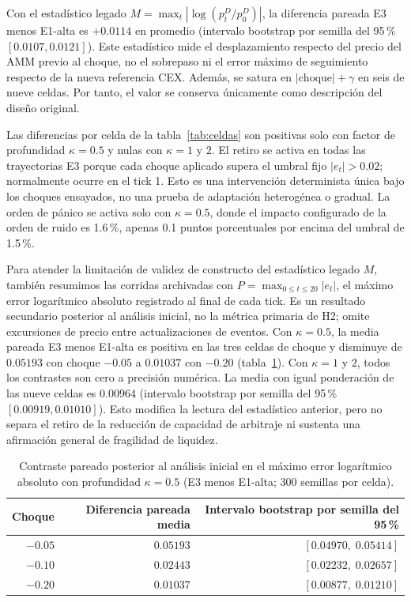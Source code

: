 Con el estadístico legado $M=\max_t|\log(p_t^D/p_0^D)|$, la diferencia pareada E3 menos E1-alta es $+0.0114$ en promedio (intervalo bootstrap por semilla del 95\,\% $[0.0107,0.0121]$). Este estadístico mide el desplazamiento respecto del precio del AMM previo al choque, no el sobrepaso ni el error máximo de seguimiento respecto de la nueva referencia CEX. Además, se satura en $|\text{choque}|+\gamma$ en seis de nueve celdas. Por tanto, el valor se conserva únicamente como descripción del diseño original.

Las diferencias por celda de la tabla~\ref{tab:celdas} son positivas solo con factor de profundidad $\kappa=0.5$ y nulas con $\kappa=1$ y $2$. El retiro se activa en todas las trayectorias E3 porque cada choque aplicado supera el umbral fijo $|e_t|>0.02$; normalmente ocurre en el tick 1. Esto es una intervención determinista única bajo los choques ensayados, no una prueba de adaptación heterogénea o gradual. La orden de pánico se activa solo con $\kappa=0.5$, donde el impacto configurado de la orden de ruido es 1.6\,\%, apenas 0.1 puntos porcentuales por encima del umbral de 1.5\,\%.

Para atender la limitación de validez de constructo del estadístico legado $M$, también resumimos las corridas archivadas con $P=\max_{0\le t\le20}|e_t|$, el máximo error logarítmico absoluto registrado al final de cada tick. Es un resultado secundario posterior al análisis inicial, no la métrica primaria de H2; omite excursiones de precio entre actualizaciones de eventos. Con $\kappa=0.5$, la media pareada E3 menos E1-alta es positiva en las tres celdas de choque y disminuye de $0.05193$ con choque $-0.05$ a $0.01037$ con $-0.20$ (tabla~\ref{tab:h2-peak-error}). Con $\kappa=1$ y $2$, todos los contrastes son cero a precisión numérica. La media con igual ponderación de las nueve celdas es $0.00964$ (intervalo bootstrap por semilla del 95\,\% $[0.00919,0.01010]$). Esto modifica la lectura del estadístico anterior, pero no separa el retiro de la reducción de capacidad de arbitraje ni sustenta una afirmación general de fragilidad de liquidez.

\begin{table}[htbp]
\centering
\caption{Contraste pareado posterior al análisis inicial en el máximo error logarítmico absoluto con profundidad $\kappa=0.5$ (E3 menos E1-alta; 300 semillas por celda).}
\label{tab:h2-peak-error}
\small
\begin{tabular}{@{}rrr@{}}
\toprule
Choque & Diferencia pareada media & Intervalo bootstrap por semilla del 95\,\% \\
\midrule
$-0.05$ & $0.05193$ & $[0.04970,\;0.05414]$ \\
$-0.10$ & $0.02443$ & $[0.02232,\;0.02657]$ \\
$-0.20$ & $0.01037$ & $[0.00877,\;0.01210]$ \\
\bottomrule
\end{tabular}
\end{table}

